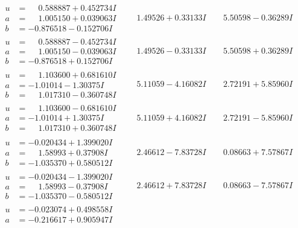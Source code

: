 \documentclass[1p]{elsarticle_modified}
\theoremstyle{definition}
\begin{document}
$$\begin{array}{c|c|c}
\begin{aligned}
u &= \phantom{-}0.588887 + 0.452734 I \\
a &= \phantom{-}1.005150 + 0.039063 I \\
b &= -0.876518 - 0.152706 I\end{aligned}
 & \phantom{-}1.49526 + 0.33133 I & \phantom{-}5.50598 - 0.36289 I \\ \hline\begin{aligned}
u &= \phantom{-}0.588887 - 0.452734 I \\
a &= \phantom{-}1.005150 - 0.039063 I \\
b &= -0.876518 + 0.152706 I\end{aligned}
 & \phantom{-}1.49526 - 0.33133 I & \phantom{-}5.50598 + 0.36289 I \\ \hline\begin{aligned}
u &= \phantom{-}1.103600 + 0.681610 I \\
a &= -1.01014 - 1.30375 I \\
b &= \phantom{-}1.017310 - 0.360748 I\end{aligned}
 & \phantom{-}5.11059 - 4.16082 I & \phantom{-}2.72191 + 5.85960 I \\ \hline\begin{aligned}
u &= \phantom{-}1.103600 - 0.681610 I \\
a &= -1.01014 + 1.30375 I \\
b &= \phantom{-}1.017310 + 0.360748 I\end{aligned}
 & \phantom{-}5.11059 + 4.16082 I & \phantom{-}2.72191 - 5.85960 I \\ \hline\begin{aligned}
u &= -0.020434 + 1.399020 I \\
a &= \phantom{-}1.58993 + 0.37908 I \\
b &= -1.035370 + 0.580512 I\end{aligned}
 & \phantom{-}2.46612 - 7.83728 I & \phantom{-}0.08663 + 7.57867 I \\ \hline\begin{aligned}
u &= -0.020434 - 1.399020 I \\
a &= \phantom{-}1.58993 - 0.37908 I \\
b &= -1.035370 - 0.580512 I\end{aligned}
 & \phantom{-}2.46612 + 7.83728 I & \phantom{-}0.08663 - 7.57867 I \\ \hline\begin{aligned}
u &= -0.023074 + 0.498558 I \\
a &= -0.216617 + 0.905947 I \\

\end{aligned}
\end{array}$$
\end{document}
